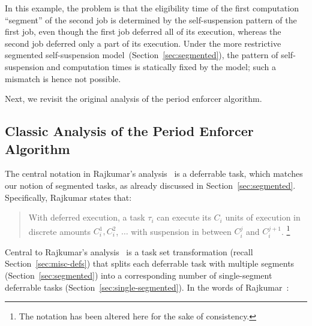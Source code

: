 In this example, the problem is that the eligibility time of the first computation ``segment'' of the second job is determined by the self-suspension pattern of the first job, even though the first job deferred all of its execution, whereas the second job deferred only a part of its execution. Under the more restrictive segmented self-suspension model~(Section~\ref{sec:segmented}), the pattern of self-suspension and computation times is statically fixed by the model; such a mismatch is hence not possible.

Next, we revisit the original analysis of the period enforcer algorithm.


\subsection{Classic Analysis of the Period Enforcer Algorithm}
\label{sec:classic-analysis}

The central notation in Rajkumar's analysis~\cite{Raj:suspension1991} is a deferrable task, which matches our notion of segmented tasks, as already discussed in Section~\ref{sec:segmented}.  Specifically, Rajkumar states that:
\begin{quote}
With deferred execution, a task $\tau_i$ can execute its $C_i$ units of execution in discrete amounts $C_i^1, C_i^2$, $\ldots$ with suspension in between $C_i^j$ and $C_i^{j+1}$. \cite[Section 3]{Raj:suspension1991}\footnote{The notation has been altered here for the sake of consistency. } 
\end{quote}


Central to Rajkumar's analysis~\cite{Raj:suspension1991} is a task set transformation (recall Section~\ref{sec:misc-defs}) that splits each deferrable task with multiple segments (Section~\ref{sec:segmented}) into a corresponding number of single-segment deferrable tasks (Section~\ref{sec:single-segmented}).  In the words of Rajkumar~\cite[Section 3]{Raj:suspension1991}:

